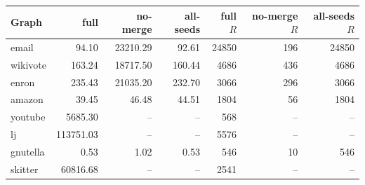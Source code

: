 \begin{tabular}{lrrrrrr}
\toprule
Graph & full & no-merge & all-seeds & full $R$ & no-merge $R$ & all-seeds $R$ \\
\midrule
email & 94.10 & 23210.29 & 92.61 & 24850 & 196 & 24850 \\
wikivote & 163.24 & 18717.50 & 160.44 & 4686 & 436 & 4686 \\
enron & 235.43 & 21035.20 & 232.70 & 3066 & 296 & 3066 \\
amazon & 39.45 & 46.48 & 44.51 & 1804 & 56 & 1804 \\
youtube & 5685.30 & -- & -- & 568 & -- & -- \\
lj & 113751.03 & -- & -- & 5576 & -- & -- \\
gnutella & 0.53 & 1.02 & 0.53 & 546 & 10 & 546 \\
skitter & 60816.68 & -- & -- & 2541 & -- & -- \\
\bottomrule
\end{tabular}
